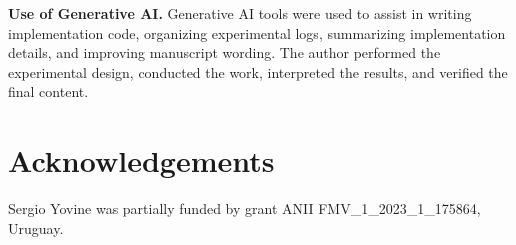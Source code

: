\documentclass[sigconf,nonacm]{acmart}
\begin{document}
\smallskip
\noindent\textbf{Use of Generative AI.}\enspace
Generative AI tools were used to assist in writing implementation code,
organizing experimental logs, summarizing implementation details, and
improving manuscript wording.  The author performed the experimental design,
conducted the work, interpreted the results, and verified the final content.

\section*{Acknowledgements}

Sergio Yovine was partially funded by grant ANII FMV\_1\_2023\_1\_175864, Uruguay.

\balance
\end{document}
